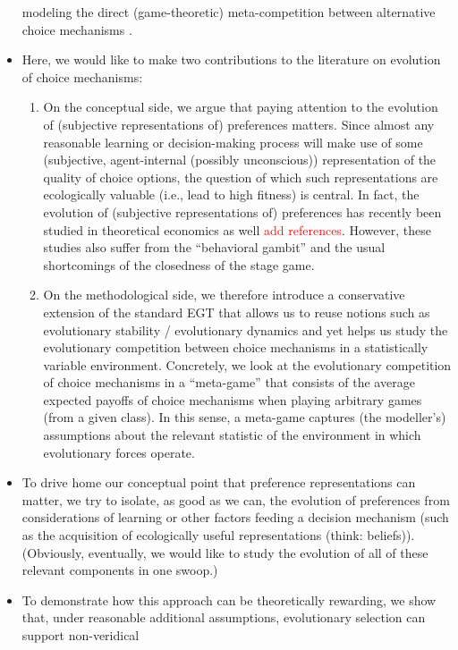 \documentclass[fleqn,reqno,11pt]{article}
\newcommand{\myalert}[1]{\textcolor{red}{#1}}
\begin{document}
\begin{itemize}
  modeling the direct (game-theoretic) meta-competition between alternative choice mechanisms
  \citep[see][for related criticism]{FawcettHamblin2013:Exposing-the-be}.
\item Here, we would like to make two contributions to the literature on evolution of choice
  mechanisms:
  \begin{enumerate}
  \item On the conceptual side, we argue that paying attention to the evolution of (subjective
    representations of) preferences matters. Since almost any reasonable learning or
    decision-making process will make use of some (subjective, agent-internal (possibly
    unconscious)) representation of the quality of choice options, the question of which such
    representations are ecologically valuable (i.e., lead to high fitness) is central. In fact,
    the evolution of (subjective representations of) preferences has recently been studied in
    theoretical economics as well \myalert{add references}. However, these studies also suffer
    from the ``behavioral gambit'' and the usual shortcomings of the closedness of the stage game. 
  \item On the methodological side, we therefore introduce a conservative extension of the
    standard EGT that allows us to reuse notions such as evolutionary stability / evolutionary
    dynamics and yet helps us study the evolutionary competition between choice mechanisms in a
    statistically variable environment. Concretely, we look at the evolutionary competition of
    choice mechanisms in a ``meta-game'' that consists of the average expected payoffs of
    choice mechanisms when playing arbitrary games (from a given class). In this sense, a
    meta-game captures (the modeller's) assumptions about the relevant statistic of the
    environment in which evolutionary forces operate.
  \end{enumerate}
\item To drive home our conceptual point that preference representations can matter, we try to
  isolate, as good as we can, the evolution of preferences from considerations of learning or
  other factors feeding a decision mechanism (such as the acquisition of ecologically useful
  representations (think: beliefs)). (Obviously, eventually, we would like to study the
  evolution of all of these relevant components in one swoop.)
\item To demonstrate how this approach can be theoretically rewarding, we show that, under
  reasonable additional assumptions, evolutionary selection can support non-veridical

\end{itemize}
\end{document}
